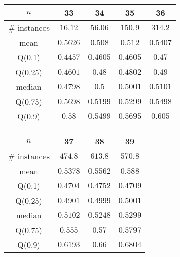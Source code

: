 \begin{tabular}{c|cccc} 
\hline 
$n$ & 33 & 34 & 35 & 36 \tabularnewline 
\hline 
\hline 
\# instances & $16.12$ & $56.06$ & $150.9$ & $314.2$ \tabularnewline 
mean & $0.5626$ & $0.508$ & $0.512$ & $0.5407$ \tabularnewline 
Q(0.1) & $0.4457$ & $0.4605$ & $0.4605$ & $0.47$ \tabularnewline 
Q(0.25) & $0.4601$ & $0.48$ & $0.4802$ & $0.49$ \tabularnewline 
median & $0.4798$ & $0.5$ & $0.5001$ & $0.5101$ \tabularnewline 
Q(0.75) & $0.5698$ & $0.5199$ & $0.5299$ & $0.5498$ \tabularnewline 
Q(0.9) & $0.58$ & $0.5499$ & $0.5695$ & $0.605$ \tabularnewline 
\hline 
\end{tabular} 
\medskip{} 

\begin{tabular}{c|ccc} 
\hline 
$n$ & 37 & 38 & 39 \tabularnewline 
\hline 
\hline 
\# instances & $474.8$ & $613.8$ & $570.8$ \tabularnewline 
mean & $0.5378$ & $0.5562$ & $0.588$ \tabularnewline 
Q(0.1) & $0.4704$ & $0.4752$ & $0.4709$ \tabularnewline 
Q(0.25) & $0.4901$ & $0.4999$ & $0.5001$ \tabularnewline 
median & $0.5102$ & $0.5248$ & $0.5299$ \tabularnewline 
Q(0.75) & $0.555$ & $0.57$ & $0.5797$ \tabularnewline 
Q(0.9) & $0.6193$ & $0.66$ & $0.6804$ \tabularnewline 
\hline 
\end{tabular} 
\medskip{} 

